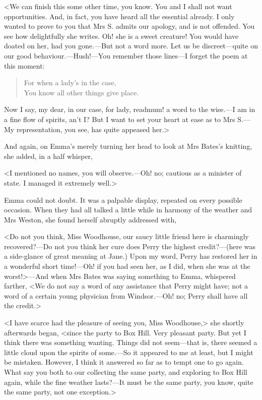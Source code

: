 <We can finish this some other time, you know. You and I shall not want opportunities. And, in fact, you have heard all the essential already. I only wanted to prove to you that Mrs S. admits our apology, and is not offended. You see how delightfully she writes. Oh! she is a sweet creature! You would have doated on her, had you gone.—But not a word more. Let us be discreet—quite on our good behaviour.—Hush!—You remember those lines—I forget the poem at this moment:

\begin{verse}
For when a lady's in the case,\\
You know all other things give place.
\end{verse}


Now I say, my dear, in our case, for lady, read\doubleemdash mum! a word to the wise.—I am in a fine flow of spirits, an't I\@? But I want to set your heart at ease as to Mrs S.—My representation, you see, has quite appeased her.>

And again, on Emma's merely turning her head to look at Mrs Bates's knitting, she added, in a half whisper,

<I mentioned no names, you will observe.—Oh! no; cautious as a minister of state. I managed it extremely well.>

Emma could not doubt. It was a palpable display, repeated on every possible occasion. When they had all talked a little while in harmony of the weather and Mrs Weston, she found herself abruptly addressed with,

<Do not you think, Miss Woodhouse, our saucy little friend here is charmingly recovered?—Do not you think her cure does Perry the highest credit?—(here was a side-glance of great meaning at Jane.) Upon my word, Perry has restored her in a wonderful short time!—Oh! if you had seen her, as I did, when she was at the worst!>—And when Mrs Bates was saying something to Emma, whispered farther, <We do not say a word of any assistance that Perry might have; not a word of a certain young physician from Windsor.—Oh! no; Perry shall have all the credit.>

<I have scarce had the pleasure of seeing you, Miss Woodhouse,> she shortly afterwards began, <since the party to Box Hill. Very pleasant party. But yet I think there was something wanting. Things did not seem—that is, there seemed a little cloud upon the spirits of some.—So it appeared to me at least, but I might be mistaken. However, I think it answered so far as to tempt one to go again. What say you both to our collecting the same party, and exploring to Box Hill again, while the fine weather lasts?—It must be the same party, you know, quite the same party, not one exception.>

